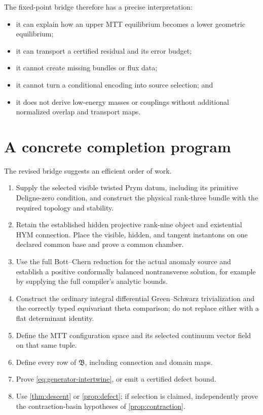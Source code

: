 \documentclass[11pt]{article}
\theoremstyle{definition}
\theoremstyle{remark}
\begin{document}
The fixed-point bridge therefore has a precise interpretation:
\begin{itemize}[leftmargin=1.5em]
\item it can explain how an upper MTT equilibrium becomes a lower geometric
      equilibrium;
\item it can transport a certified residual and its error budget;
\item it cannot create missing bundles or flux data;
\item it cannot turn a conditional encoding into source selection; and
\item it does not derive low-energy masses or couplings without additional
      normalized overlap and transport maps.
\end{itemize}

\section{A concrete completion program}
\label{sec:frontier}

The revised bridge suggests an efficient order of work.
\begin{enumerate}[leftmargin=1.7em]
\item Supply the selected visible twisted Prym datum, including its primitive
      Deligne-zero condition, and construct the physical rank-three bundle
      with the required topology and stability.
\item Retain the established hidden projective rank-nine object and
      existential HYM connection.  Place the visible, hidden, and tangent
      instantons on one declared common base and prove a common chamber.
\item Use the full Bott--Chern reduction for the actual anomaly source and
      establish a positive conformally balanced nontransverse solution,
      for example by supplying the full compiler's analytic bounds.
\item Construct the ordinary integral differential Green--Schwarz
      trivialization and the correctly typed equivariant theta comparison;
      do not replace either with a flat determinant identity.
\item Define the MTT configuration space and its selected continuum vector
      field on that same tuple.
\item Define every row of \(\mathfrak B\), including connection and domain
      maps.
\item Prove \cref{eq:generator-intertwine}, or emit a certified defect bound.
\item Use \cref{thm:descent} or \cref{prop:defect}; if selection is claimed,
      independently prove the contraction-basin hypotheses of
      \cref{prop:contraction}.
\end{enumerate}
\end{document}

